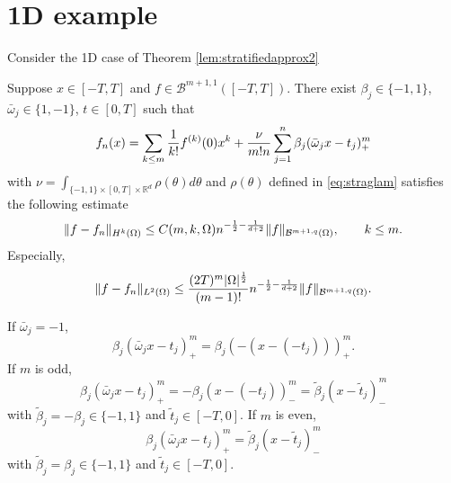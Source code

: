 
\section{1D example}
Consider the 1D case of Theorem \ref{lem:stratifiedapprox2}
\begin{theorem}
Suppose $x\in [-T, T]$ and $f\in \mathcal{B}^{m+1, 1}([-T, T])$.
There exist $\beta_j\in \{-1, 1\}$, $\bar \omega_j\in\{1, -1\}$, $t\in [0,T]$ such that 
\begin{equation}\label{1drepresentation}
f_n(x)= \sum_{k\le m}{1\over k!}f^{(k)}(0) x^k + {\nu\over m!n}\sum_{j=1}^{n}\beta_j (\bar \omega_j x - t_j)_+^m
\end{equation} 
with $\nu=\int_{\{-1,1\}\times [0,T]\times \mathbb{R}^{d}} \rho(\theta)d\theta$ and $\rho(\theta)$  defined in \eqref{eq:straglam} 
satisfies the following estimate
\begin{equation}
\|f - f_n \|_{H^k(\Omega)} \leq C(m,k,\Omega) n^{-{1\over 2}-{1\over d+2}}\|f\|_{\mathcal B^{m+1, q}(\Omega)},\qquad k\le m.
\end{equation} 
Especially,
\begin{equation}
\|f - f_n \|_{L^2(\Omega)} \leq {(2T)^m|\Omega|^{1\over 2}\over (m-1)!} n^{-{1\over 2}-{1\over d+2}}\|f\|_{\mathcal B^{m+1, q}(\Omega)}.
\end{equation} 
\end{theorem} 

If $\bar \omega_j=-1$,
\begin{equation} 
\beta_j (\bar \omega_j  x - t_j)_+^m = \beta_j (- (x - (-t_j)))_+^m.
\end{equation} 
If $m$ is odd, 
\begin{equation} 
\beta_j (\bar \omega_j  x - t_j)_+^m = - \beta_j (x - (-t_j))_-^m = \tilde \beta_j(x - \tilde t_j)_-^m
\end{equation} 
with $\tilde \beta_j=-\beta_j\in \{-1, 1\}$ and $\tilde t_j\in[-T, 0]$.
If $m$ is even, 
\begin{equation} 
\beta_j (\bar \omega_j  x - t_j)_+^m = \tilde \beta_j (x - \tilde t_j)_-^m
\end{equation} 
with $\tilde \beta_j=\beta_j\in \{-1, 1\}$ and $\tilde t_j\in[-T, 0]$.


